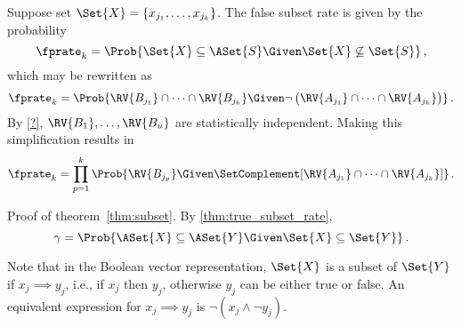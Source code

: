 \documentclass[ ../main.tex]{subfiles}
\newcommand{\tsr}{\gamma}
\begin{document}



Suppose set $\Set{X} = \{x_{j_1},\ldots,x_{j_k}\}$. The false 
subset rate is given by the probability
\begin{equation}
\fprate_k = \Prob{\Set{X} \subseteq \ASet{S} \Given 
	\Set{X} \not\subseteq \Set{S}}\,,
\end{equation}
which may be rewritten as
\begin{equation}
\fprate_k = \Prob{\RV{B_{j_1}} \cap \cdots \cap \RV{B_{j_k}}
	\Given \neg \left(\RV{A_{j_1}} \cap \cdots \cap 
	\RV{A_{j_k}}\right)}\,.
\end{equation}
By \cref{?}, $\RV{B_1},\ldots,\RV{B_u}$ are statistically 
independent. Making this simplification results in
\begin{equation}
\fprate_k = \prod_{p=1}^{k} \Prob{\RV{B_{j_p}} \Given 
	\SetComplement[\RV{A_{j_1}} \cap \cdots \cap \RV{A_{j_k}}]}\,.
\end{equation}

Proof of theorem~\ref{thm:subset}.
By \cref{thm:true_subset_rate},
\begin{equation}
\tsr = \Prob{\ASet{X} \subseteq \ASet{Y} \Given \Set{X} \subseteq 
	\Set{Y}}\,.
\end{equation}

Note that in the Boolean vector representation, $\Set{X}$ is a subset of $\Set{Y}$ if $x_j \implies y_j$, i.e., if $x_j$ then $y_j$, otherwise $y_j$ can 
be either true or false.
An equivalent expression for $x_j \implies y_j$ is $\neg (x_j \land \neg y_j)$.
	
\end{document}
